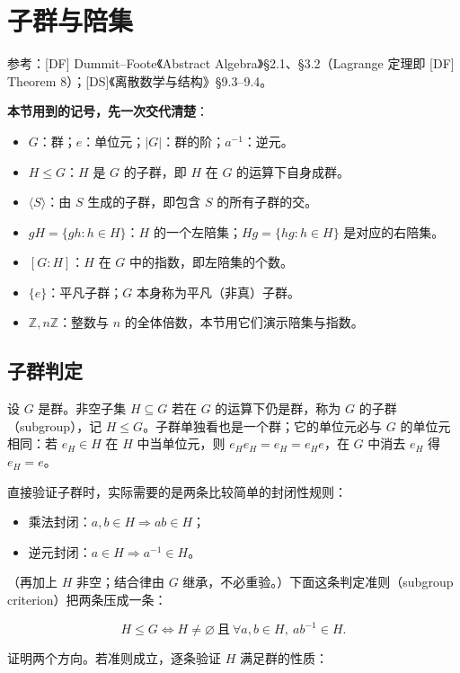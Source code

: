 \section{子群与陪集}


参考：[DF] Dummit–Foote《Abstract Algebra》§2.1、§3.2（Lagrange 定理即 [DF] Theorem 8）；[DS]《离散数学与结构》§9.3–9.4。

\textbf{本节用到的记号，先一次交代清楚}：

\begin{itemize}
\item $G$：群；$e$：单位元；$|G|$：群的阶；$a^{-1}$：逆元。
\item $H\le G$：$H$ 是 $G$ 的子群，即 $H$ 在 $G$ 的运算下自身成群。
\item $\langle S\rangle$：由 $S$ 生成的子群，即包含 $S$ 的所有子群的交。
\item $gH=\{gh:h\in H\}$：$H$ 的一个左陪集；$Hg=\{hg:h\in H\}$ 是对应的右陪集。
\item $[G:H]$：$H$ 在 $G$ 中的指数，即左陪集的个数。
\item $\{e\}$：平凡子群；$G$ 本身称为平凡（非真）子群。
\item $\mathbb Z,n\mathbb Z$：整数与 $n$ 的全体倍数，本节用它们演示陪集与指数。
\end{itemize}


\subsection{子群判定}


设 $G$ 是群。非空子集 $H\subseteq G$ 若在 $G$ 的运算下仍是群，称为 $G$ 的子群（subgroup），记 $H\le G$。子群单独看也是一个群；它的单位元必与 $G$ 的单位元相同：若 $e_H\in H$ 在 $H$ 中当单位元，则 $e_He_H=e_H=e_He$，在 $G$ 中消去 $e_H$ 得 $e_H=e$。

直接验证子群时，实际需要的是两条比较简单的封闭性规则：

\begin{itemize}
\item 乘法封闭：$a,b\in H\Rightarrow ab\in H$；
\item 逆元封闭：$a\in H\Rightarrow a^{-1}\in H$。
\end{itemize}


（再加上 $H$ 非空；结合律由 $G$ 继承，不必重验。）下面这条判定准则（subgroup criterion）把两条压成一条：

\[H\le G\iff H\ne\varnothing\ \text{且}\ \forall a,b\in H,\ ab^{-1}\in H.\]

证明两个方向。若准则成立，逐条验证 $H$ 满足群的性质：

